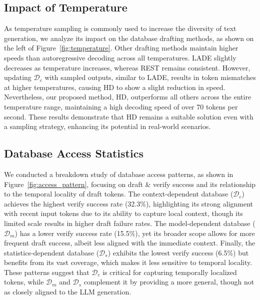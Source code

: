 \subsection{Impact of Temperature}

As temperature sampling is commonly used to increase the diversity of text generation, we analyze its impact on the database drafting methods, as shown on the left of Figure~\ref{fig:temperature}.  
Other drafting methods maintain higher speeds than autoregressive decoding across all temperatures. LADE slightly decreases as temperature increases, whereas REST remains consistent.
However, updating \(\mathcal{D}_c\)  with sampled outputs, similar to LADE, results in token mismatches at higher temperatures, causing HD to show a slight reduction in speed.
Nevertheless, our proposed method, HD, outperforms all others across the entire temperature range, maintaining a high decoding speed of over 70 tokens per second.
These results demonstrate that HD remains a suitable solution even with a sampling strategy, enhancing its potential in real-world scenarios.
% 

\subsection{Database Access Statistics}



We conducted a breakdown study of database access patterns, as shown in Figure~\ref{fig:access_pattern}, focusing on draft \& verify success and its relationship to the temporal locality of draft tokens. The context-dependent database (\(\mathcal{D}_c\)) achieves the highest verify success rate (32.3\%), highlighting its strong alignment with recent input tokens due to its ability to capture local context, though its limited scale results in higher draft failure rates. The model-dependent database (\(\mathcal{D}_m\)) has a lower verify success rate (15.5\%), yet its broader scope allows for more frequent draft success, albeit less aligned with the immediate context. Finally, the statistics-dependent database (\(\mathcal{D}_s\)) exhibits the lowest verify success (6.5\%) but benefits from its vast coverage, which makes it less sensitive to temporal locality. These patterns suggest that \(\mathcal{D}_c\) is critical for capturing temporally localized tokens, while \(\mathcal{D}_m\) and \(\mathcal{D}_s\) complement it by providing a more general, though not as closely aligned to the LLM generation.

